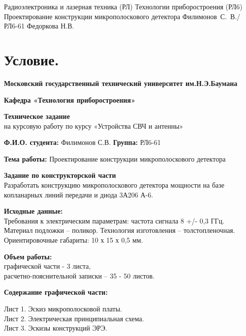\documentclass{bmstu}
\begin{document}
	\makecourseworktitle
	{Радиоэлектроника и лазерная техника (РЛ)} %
	{Технологии приборостроения (РЛ6)} %
	{Проектирование конструкции микрополоскового детектора} %
	{Филимонов~С.~В./РЛ6-61} %
	{Федоркова Н.В.} %
	{}
	
	\tableofcontents
	
	\chapter{Условие.}
	
	\begin{center}
	\textbf{Московский государственный технический университет им.Н.Э.Баумана}
	
	\textbf{Кафедра «Технология приборостроения»}
	
	\textbf{Техническое задание} \\
	на курсовую работу по курсу «Устройства СВЧ и антенны»
	\end{center}
	
\noindent \textbf{Ф.И.О. студента:}  Филимонов С.В.
\noindent \textbf{Группа:}     РЛ6-61
	
\noindent \textbf{Тема работы:}  Проектирование конструкции микрополоскового детектора
	
\noindent \textbf{Задание по конструкторской части} \\
\indent Разработать конструкцию микрополоскового детектора мощности на базе копланарных линий передачи и диода 3А206 А-6.
	
\noindent \textbf{Исходные данные:}\\
\indent Требования к электрическим параметрам: частота сигнала 8 +/- 0,3 ГГц. Материал подложки – поликор. Технология изготовления – толстопленочная. Ориентировочные габариты: 10 х 15 х 0,5 мм.
	
\noindent \textbf{Объем работы:} \\
\indent графической части -  3 листа,\\
\indent расчетно-пояснительной записки – 35 - 50 листов.
	
\noindent \textbf{Содержание графической части:}
	
\indent Лист 1. Эскиз микрополосковой платы.\\
\indent Лист 2. Электрическая принципиальная схема.\\ 
\indent Лист 3. Эскизы конструкций ЭРЭ.
	
\end{document}
